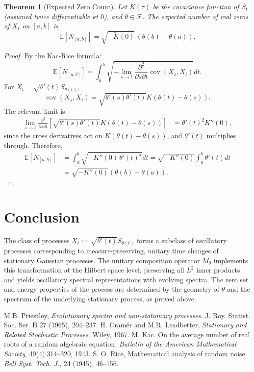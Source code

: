 \documentclass[11pt]{article}
\newtheorem{theorem}{Theorem}
\begin{document}
\begin{theorem}[Expected Zero Count]\label{thm:zerocount}
Let $K(\tau)$ be the covariance function of $S_t$ (assumed twice differentiable at $0$), and $\theta\in\mathcal{F}$. The expected number of real zeros of $X_t$ on $[a,b]$ is
\begin{equation}
    \mathbb{E}[N_{[a,b]}] = \sqrt{ -\ddot{K}(0) }\,(\theta(b)-\theta(a)).
\end{equation}
\end{theorem}

\begin{proof}
By the Kac-Rice formula:
\begin{equation}
    \mathbb{E}[N_{[a,b]}] = \int_a^b 
    \sqrt{ -\lim_{s\to t} \frac{\partial^2}{\partial s\partial t} \operatorname{cov}(X_s,X_t) } dt.
\end{equation}
For $X_t = \sqrt{\theta'(t)} S_{\theta(t)}$,
\[
    \operatorname{cov}(X_s, X_t) = \sqrt{\theta'(s)\theta'(t)} K(\theta(t)-\theta(s)).
\]
The relevant limit is:
\begin{align*}
    \lim_{s\to t} \frac{\partial^2}{\partial s\partial t} \left[ \sqrt{\theta'(s)\theta'(t)} K(\theta(t)-\theta(s)) \right]
    &= \theta'(t)^2 K''(0),
\end{align*}
since the cross derivatives act on $K(\theta(t)-\theta(s))$, and $\theta'(t)$ multiplies through. Therefore, 
\begin{align*}
    \mathbb{E}[N_{[a,b]}] &= \int_a^b \sqrt{ - K''(0)\, \theta'(t)^2 } dt
    = \sqrt{ -K''(0) } \int_a^b \theta'(t) dt\\
    &= \sqrt{ -K''(0) } (\theta(b)-\theta(a)).
\end{align*}
\end{proof}

\section{Conclusion}

The class of processes $X_t := \sqrt{\theta'(t)} S_{\theta(t)}$ forms a subclass of oscillatory processes corresponding to measure-preserving, unitary time changes of stationary Gaussian processes. The unitary composition operator $M_\theta$ implements this transformation at the Hilbert space level, preserving all $L^2$ inner products and yields oscillatory spectral representations with evolving spectra. The zero set and energy properties of the process are determined by the geometry of $\theta$ and the spectrum of the underlying stationary process, as proved above.

\begin{thebibliography}{99}
   M.B. Priestley, \emph{Evolutionary spectra and non-stationary processes}. J. Roy. Statist. Soc. Ser. B 27 (1965), 204--237.
   H. Cramér and M.R. Leadbetter, \emph{Stationary and Related Stochastic Processes}. Wiley, 1967.
   M. Kac. On the average number of real roots of a random algebraic equation. \emph{Bulletin of the American Mathematical Society}, 49(4):314--320, 1943.
   S. O. Rice, Mathematical analysis of random noise. \emph{Bell Syst. Tech. J.}, 24 (1945), 46--156.
\end{thebibliography}
\end{document}
